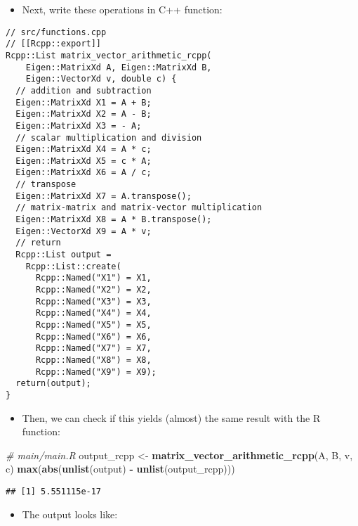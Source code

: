 \documentclass[
]{book}
\newenvironment{Shaded}{\begin{snugshade}}{\end{snugshade}}
\newcommand{\CommentTok}[1]{\textcolor[rgb]{0.56,0.35,0.01}{\textit{#1}}}
\newcommand{\KeywordTok}[1]{\textcolor[rgb]{0.13,0.29,0.53}{\textbf{#1}}}
\newcommand{\NormalTok}[1]{#1}
\newcommand{\OperatorTok}[1]{\textcolor[rgb]{0.81,0.36,0.00}{\textbf{#1}}}
\newcommand{\StringTok}[1]{\textcolor[rgb]{0.31,0.60,0.02}{#1}}
\providecommand{\tightlist}{%
  \setlength{\itemsep}{0pt}\setlength{\parskip}{0pt}}
\begin{document}
\begin{itemize}
\tightlist
\item
  Next, write these operations in C++ function:
\end{itemize}

\begin{verbatim}
// src/functions.cpp
// [[Rcpp::export]]
Rcpp::List matrix_vector_arithmetic_rcpp(
    Eigen::MatrixXd A, Eigen::MatrixXd B, 
    Eigen::VectorXd v, double c) {
  // addition and subtraction
  Eigen::MatrixXd X1 = A + B;
  Eigen::MatrixXd X2 = A - B;
  Eigen::MatrixXd X3 = - A;
  // scalar multiplication and division
  Eigen::MatrixXd X4 = A * c;
  Eigen::MatrixXd X5 = c * A;
  Eigen::MatrixXd X6 = A / c;
  // transpose
  Eigen::MatrixXd X7 = A.transpose();
  // matrix-matrix and matrix-vector multiplication
  Eigen::MatrixXd X8 = A * B.transpose();
  Eigen::VectorXd X9 = A * v;
  // return 
  Rcpp::List output = 
    Rcpp::List::create(
      Rcpp::Named("X1") = X1,
      Rcpp::Named("X2") = X2,
      Rcpp::Named("X3") = X3,
      Rcpp::Named("X4") = X4,
      Rcpp::Named("X5") = X5,
      Rcpp::Named("X6") = X6,
      Rcpp::Named("X7") = X7,
      Rcpp::Named("X8") = X8,
      Rcpp::Named("X9") = X9);
  return(output);
}
\end{verbatim}

\begin{itemize}
\tightlist
\item
  Then, we can check if this yields (almost) the same result with the R function:
\end{itemize}

\begin{Shaded}
\begin{Highlighting}[]
\CommentTok{# main/main.R}
\NormalTok{output_rcpp <-}\StringTok{ }\KeywordTok{matrix_vector_arithmetic_rcpp}\NormalTok{(A, B, v, c)}
\KeywordTok{max}\NormalTok{(}\KeywordTok{abs}\NormalTok{(}\KeywordTok{unlist}\NormalTok{(output) }\OperatorTok{-}\StringTok{ }\KeywordTok{unlist}\NormalTok{(output_rcpp)))}
\end{Highlighting}
\end{Shaded}

\begin{verbatim}
## [1] 5.551115e-17
\end{verbatim}

\begin{itemize}
\tightlist
\item
  The output looks like:
\end{itemize}
\end{document}
